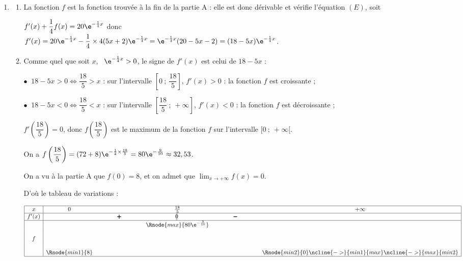 \begin{enumerate}
\item 
	\begin{enumerate}
		\item 


La fonction $f$ est la fonction trouvée à la fin de la partie A : elle est donc dérivable et vérifie l'équation $(E)$, soit 

$f'(x) + \dfrac14 f(x) = 20\e^{-\frac14 x}$ donc \\
$f'(x) = 20\e^{-\frac14 x} - \dfrac14 \times 4(5x + 2)\e^{-\frac14 x} = \e^{-\frac14 x}(20 - 5x - 2) = (18 - 5x)\e^{-\frac14 x}$.

		\item 
		Comme quel que soit $x$, \, $\e^{-\frac14 x} > 0$, le signe de $f'(x)$ est celui de $18 - 5x$ :
		
$\bullet~$ $18 - 5x > 0 \iff \dfrac{18}{5} > x$ : sur l'intervalle $\left[0~;~\dfrac{18}{5}\right], \, f'(x) > 0$ : la fonction $f$ est croissante ;

$\bullet~$ $18 - 5x < 0 \iff \dfrac{18}{5} < x$ : sur l'intervalle $\left[\dfrac{18}{5}~;~+ \infty\right], \, f'(x) < 0$ : la fonction $f$ est décroissante ;

$f'\left(\dfrac{18}{5}\right) = 0$, donc $f\left(\dfrac{18}{5}\right)$ est le maximum de la fonction $f$ sur l'intervalle $[0~;~ +\infty[$.

On a $f\left(\dfrac{18}{5}\right) = (72 + 8)\e^{-\frac14 \times \frac{18}{5}} = 80\e^{-\frac{9}{10}} \approx 32,53$.

On a vu à la partie A que $f(0) = 8$, et on admet que $\displaystyle\lim_{x \to + \infty}f(x) = 0$. 

D'où le tableau de variations :

\begin{center}
{\renewcommand{\arraystretch}{1.3}
\def\esp{\hspace*{2.5cm}}
\def\hauteur{20pt}
$\begin{array}{|c|*5{c}|}
\hline
x & 0  & \esp & \frac{18}{5} & \esp & +\infty \\ 
\hline
f'(x) &  &   \pmb{+} & \vline\hspace{-2.7pt}0 & \pmb{-} & \\ 
\hline
 & &  &   \Rnode{max}{80 \e^{-\frac{9}{10}}}  &  &   \\  
f & &     &  &  &  \rule{0pt}{\hauteur} \\ 
 & \Rnode{min1}{8} &   &  &  &   \Rnode{min2}{0} \rule{0pt}{\hauteur}    
 \ncline{->}{min1}{max} 
 \ncline{->}{max}{min2} 
 \\ 
\hline
\end{array} $
}
\end{center}	


\end{enumerate}
\end{enumerate}

